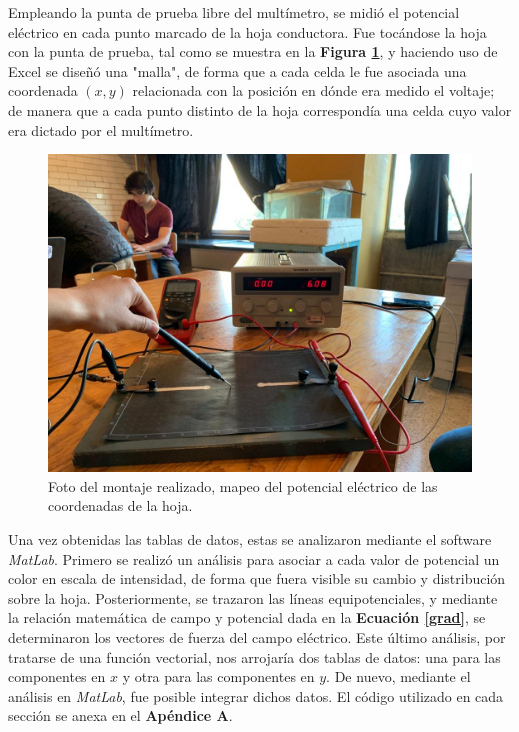 \documentclass[letterpaper, 11 pt]{article}
\begin{document}
\begin{multicols}{2}
Empleando la punta de prueba libre del multímetro, se midió el potencial eléctrico en cada punto marcado de la hoja conductora. Fue tocándose la hoja con la punta de prueba, tal como se muestra en la \textbf{Figura \ref{med}}, y haciendo uso de Excel se diseñó una "malla", de forma que a cada celda le fue asociada una coordenada $(x, y)$ relacionada con la posición en dónde era medido el voltaje; de manera que a cada punto distinto de la hoja correspondía una celda cuyo valor era dictado por el multímetro.

\begin{figure}[H]
    \captionsetup{justification=centering,margin=0.5cm}
    \includegraphics[scale=0.18]{putomiguel.jpeg}
    \centering
    \caption{Foto del montaje realizado, mapeo del potencial eléctrico de las coordenadas de la hoja.}
    \label{med}
\end{figure}


Una vez obtenidas las tablas de datos, estas se analizaron mediante el software \textit{MatLab}. Primero se realizó un análisis para asociar a cada valor de potencial un color en escala de intensidad, de forma que fuera visible su cambio y distribución sobre la hoja. Posteriormente, se trazaron las líneas equipotenciales, y mediante la relación matemática de campo y potencial dada en la \textbf{Ecuación \ref{grad}}, se determinaron los vectores de fuerza del campo eléctrico. Este último análisis, por tratarse de una función vectorial, nos arrojaría dos tablas de datos: una para las componentes en $x$ y otra para las componentes en $y$. De nuevo, mediante el análisis en \textit{MatLab}, fue posible integrar dichos datos. El código utilizado en cada sección se anexa en el \textbf{Apéndice A}.


\end{multicols}
\end{document}
